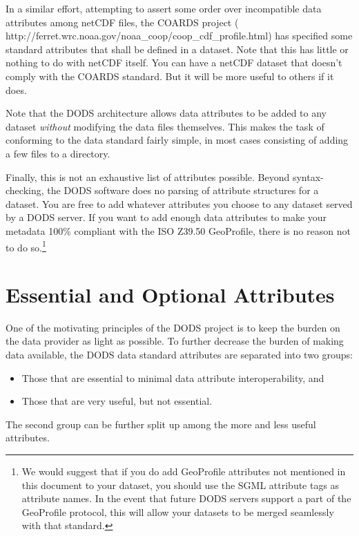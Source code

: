 In a similar effort, attempting to assert some order over incompatible
data attributes among netCDF files, the COARDS project
(
{http://ferret.wrc.noaa.gov/noaa_coop/coop_cdf_profile.html}) has
specified some standard attributes that shall be defined in a dataset.
Note that this has little or nothing to do with netCDF itself.  You
can have a netCDF dataset that doesn't comply with the COARDS
standard.  But it will be more useful to others if it does.

Note that the DODS architecture allows data attributes to be added to
any dataset \emph{without} modifying the data files themselves.
This makes the task of conforming to the data standard fairly simple,
in most cases consisting of adding a few files to a directory.

Finally, this is not an exhaustive list of attributes possible.
Beyond syntax-checking, the DODS software does no parsing of attribute
structures for a dataset.  You are free to add whatever attributes you
choose to any dataset served by a DODS server.  If you want to add
enough data attributes to make your metadata 100\% compliant with the
ISO Z39.50 GeoProfile, there is no reason not to do so.\footnote{We
  would suggest that if you do add GeoProfile attributes not mentioned
  in this document to your dataset, you should use the SGML attribute
  tags as attribute names.  In the event that future DODS servers
  support a part of the GeoProfile protocol, this will allow your
  datasets to be merged seamlessly with that standard.}

\section{Essential and Optional Attributes}

One of the motivating principles of the DODS project is to keep the
burden on the data provider as light as possible.  To further decrease
the burden of making data available, the DODS data standard attributes
are separated into two groups:

\begin{itemize}
\item Those that are essential to minimal data attribute
  interoperability, and
\item Those that are very useful, but not essential.
\end{itemize}

The second group can be further split up among the more and less
useful attributes.

